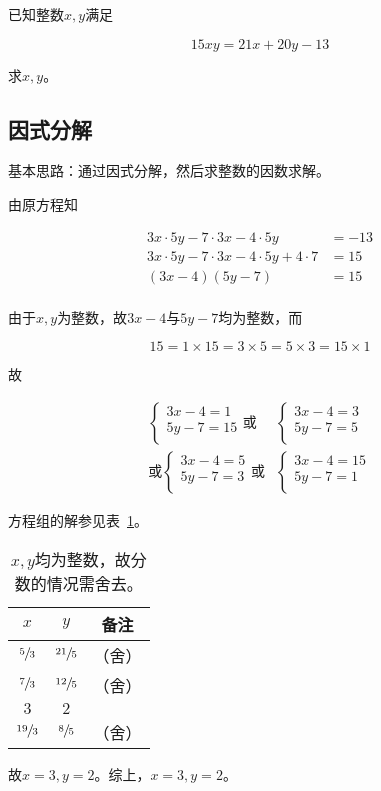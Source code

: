 

已知整数$x, y$满足

\[ 15xy = 21x + 20y - 13 \]

求$x, y$。


\subsection{因式分解}

基本思路：通过因式分解，然后求整数的因数求解。

由原方程知

\begin{align*}
  3x\cdot5y - 7\cdot3x - 4\cdot5y &= -13 \\
  3x\cdot5y - 7\cdot3x - 4\cdot5y + 4\cdot7 &= 15 \\
  (3x - 4)(5y - 7) &= 15 \\
\end{align*}

由于$x, y$为整数，故$3x - 4$与$5y - 7$均为整数，而

\[ 15 = 1\times15 = 3\times5 = 5\times3 = 15\times1 \]

故

\begin{align*}
  \begin{cases}
    3x - 4 = 1 \\ 5y - 7 = 15 \\
  \end{cases} \text{或}& \begin{cases}
    3x - 4 = 3 \\ 5y - 7 = 5 \\
  \end{cases} \\ \text{或} \begin{cases}
    3x - 4 = 5 \\ 5y - 7 = 3 \\
  \end{cases} \text{或}& \begin{cases}
    3x - 4 = 15 \\ 5y - 7 = 1 \\
  \end{cases}
\end{align*}

方程组的解参见表~\ref{tab:0057-fac}。

\begin{table}[hbp]
  \centering
  \begin{tabular}{ccc}
    \toprule
    $x$ & $y$ & 备注 \\
    \midrule
    $\sfrac53$ & $\sfrac{21}5$ & （舍） \\
    $\sfrac73$ & $\sfrac{12}5$ & （舍） \\
    $3$ & $2$ & \\
    $\sfrac{19}3$ & $\sfrac85$ & （舍） \\
    \bottomrule
  \end{tabular}
  \caption{$x, y$均为整数，故分数的情况需舍去。} \label{tab:0057-fac}
\end{table}

故$x = 3, y = 2$。综上，$x = 3, y = 2$。
